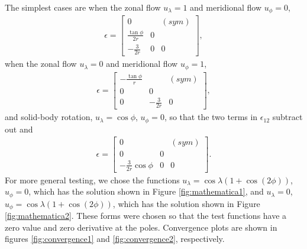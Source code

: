\documentclass[11pt]{report}
\begin{document}
The simplest cases are when the zonal flow $u_\lambda=1$ and meridional flow $u_\phi=0$, 
\begin{eqnarray}
\epsilon = \left[\begin{array}{ccc}
0 &  & (sym) \\
\displaystyle
\frac{\tan\phi}{2r} & 0 &\\
\displaystyle
 - \frac{3}{2r} & 0 & 0
\end{array}\right], 
\end{eqnarray}
when the zonal flow $u_\lambda=0$ and meridional flow $u_\phi=1$,
\begin{eqnarray}
\epsilon = \left[\begin{array}{ccc}
\displaystyle
-\frac{\tan\phi}{r} &  & (sym) \\
0 & 0 &\\
 0 & \displaystyle - \frac{3}{2r} & 0 
\end{array}\right], 
\end{eqnarray}
and solid-body rotation, $u_\lambda=\cos\phi$, $u_\phi=0$, so that the two terms in $\epsilon_{12}$ subtract out and 
\begin{eqnarray}
\epsilon = \left[\begin{array}{ccc}
\displaystyle
0 &  & (sym) \\
0 & 0 &\\
 \displaystyle - \frac{3}{2r}\cos\phi & 0 & 0
\end{array}\right].
\end{eqnarray}
For more general testing, we chose the functions $u_\lambda=\cos\lambda (1+\cos(2\phi))$, $u_\phi=0$, which has the solution shown in Figure \ref{fig:mathematica1}, and $u_\lambda=0$, $u_\phi=\cos\lambda (1+\cos(2\phi))$, which has the solution shown in Figure \ref{fig:mathematica2}.  These forms were chosen so that the test functions have a zero value and zero derivative at the poles.  Convergence plots are shown in figures \ref{fig:convergence1} and \ref{fig:convergence2}, respectively.
\end{document}
